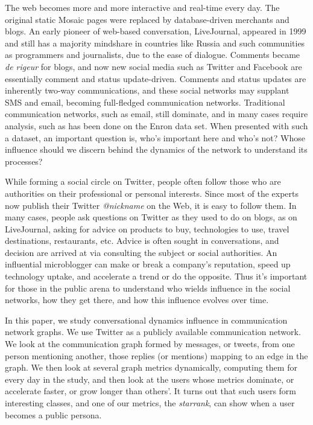 \documentclass[10pt,oneside]{memoir}
\begin{document}
\label{chapter:influence}


The web becomes more and more interactive and real-time every day.  The original static Mosaic pages were replaced by database-driven merchants and blogs.  An early pioneer of web-based conversation, LiveJournal, appeared in 1999 and still has a majority mindshare in countries like Russia and such communities as programmers and journalists, due to the ease of dialogue.  Comments became {\itshape de rigeur} for  blogs, and now new social media such as Twitter and Facebook are essentially comment and status update-driven.  Comments and status updates are inherently two-way communications, and these social networks may supplant SMS and email, becoming full-fledged communication networks.  Traditional communication networks, such as email, still dominate, and in many cases require analysis, such as has been done on the Enron data set.  When presented with such a dataset, an important question is, who's important here and who's not?  Whose influence should we discern behind the dynamics of the network to understand its processes?


While forming a social circle on Twitter, people often follow those who are authorities on their professional or personal interests.  Since most of the experts now publish their Twitter {\itshape @nickname} on the Web, it is easy to follow them.  In many cases, people ask questions on Twitter as they used to do on blogs, as on LiveJournal, asking for advice on products to buy, technologies to use, travel destinations, restaurants, etc.  Advice is often sought in conversations, and decision are arrived at via consulting the subject or social authorities.  An influential microblogger can make or break a company's reputation, speed up technology uptake, and accelerate a trend or do the opposite.  Thus it's important for those in the public arena to understand who wields influence in the social networks, how they get there, and how this influence evolves over time.


In this paper, we study conversational dynamics influence in communication network graphs.  We use Twitter as a publicly available communication network.  We look at the communication graph formed by messages, or tweets, from one person mentioning another, those replies (or mentions) mapping to an edge in the graph.  We then look at several graph metrics dynamically, computing them for every day in the study, and then look at the users whose metrics dominate, or accelerate faster, or grow longer than others'.  It turns out that such users form interesting classes, and one of our metrics, the {\itshape starrank}, can show when a user becomes a public persona.
\end{document}
